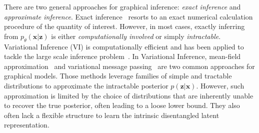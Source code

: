 \documentclass{article}
\newcommand{\RN}[1]{%
	\textup{\lowercase\expandafter{\it \romannumeral#1}}%
}
\begin{document}

There are two general approaches for graphical inference: \textit{exact inference} and \textit{approximate inference}. Exact inference~\cite{sanner2012symbolic,kahle2008junction} resorts to an exact numerical calculation procedure of the quantity of interest. 
However, in most cases, exactly inferring from $p_{\theta}(\mathbf{x}|\mathbf{z})$ is either \emph{computationally involved} or simply \emph{intractable}. 
Variational Inference (VI) is computationally efficient and has been applied to tackle the large scale inference problem~\cite{jordan1999introduction,hoffman2013stochastic, kingma2013auto, liu2016stein}.
In Variational Inference, mean-field approximation~\cite{xing2012generalized} and variational message passing~\cite{bishop2003vibes,winn2005variational} are two common approaches for graphical models.
Those methods leverage families of simple and tractable distributions to approximate the intractable posterior $p(\mathbf{z}|\mathbf{x})$.
However, such approximation is limited by the choice of distributions that are inherently unable to recover the true posterior, often leading to a loose lower bound. They also often lack a flexible structure to learn the intrinsic disentangled latent representation. 
\end{document}
